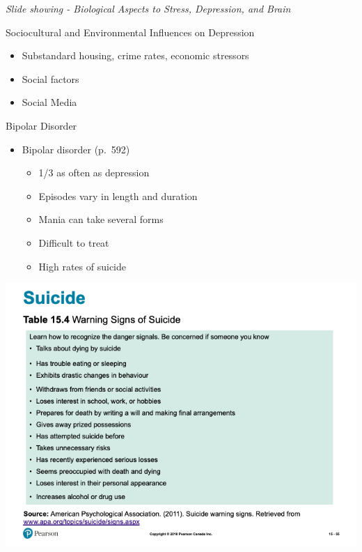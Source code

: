 \documentclass[
]{book}
\providecommand{\tightlist}{%
  \setlength{\itemsep}{0pt}\setlength{\parskip}{0pt}}
\begin{document}
\begin{reflect}
\emph{Slide showing - Biological Aspects to Stress, Depression, and Brain}

Sociocultural and Environmental Influences on Depression

\begin{itemize}
\tightlist
\item
  Substandard housing, crime rates, economic stressors\\
\item
  Social factors\\
\item
  Social Media
\end{itemize}

Bipolar Disorder

\begin{itemize}
\tightlist
\item
  Bipolar disorder (p.~592)

  \begin{itemize}
  \tightlist
  \item
    1/3 as often as depression\\
  \item
    Episodes vary in length and duration\\
  \item
    Mania can take several forms\\
  \item
    Difficult to treat\\
  \item
    High rates of suicide
  \end{itemize}
\end{itemize}

\includegraphics{assets/unit_10/slide_55.png}


\end{reflect}
\end{document}
